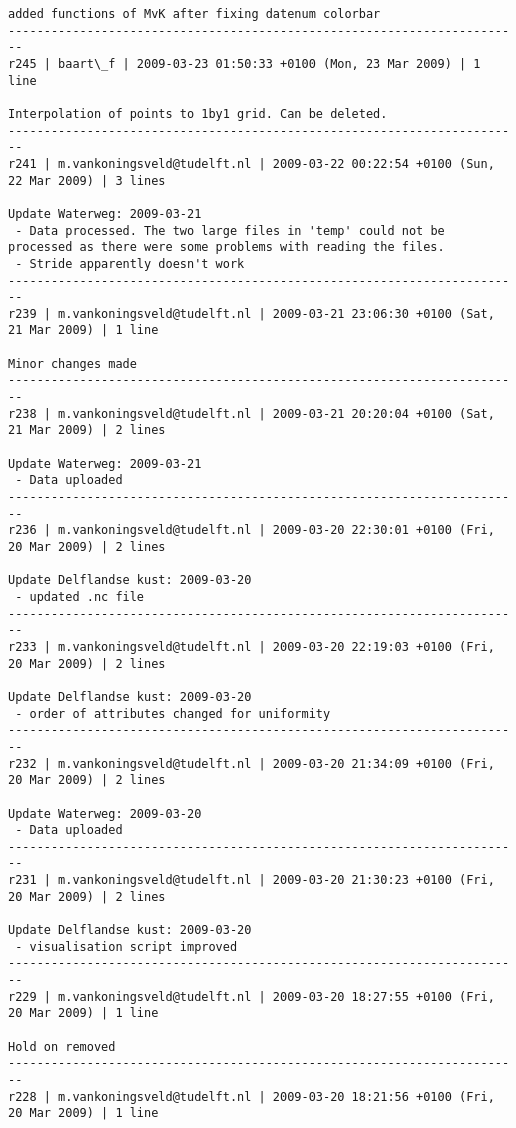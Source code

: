 \documentclass[9]{report}
\begin{document}
\begin{description}
\begin{verbatim}
added functions of MvK after fixing datenum colorbar
------------------------------------------------------------------------
r245 | baart\_f | 2009-03-23 01:50:33 +0100 (Mon, 23 Mar 2009) | 1 line

Interpolation of points to 1by1 grid. Can be deleted.
------------------------------------------------------------------------
r241 | m.vankoningsveld@tudelft.nl | 2009-03-22 00:22:54 +0100 (Sun, 22 Mar 2009) | 3 lines

Update Waterweg: 2009-03-21
 - Data processed. The two large files in 'temp' could not be processed as there were some problems with reading the files. 
 - Stride apparently doesn't work
------------------------------------------------------------------------
r239 | m.vankoningsveld@tudelft.nl | 2009-03-21 23:06:30 +0100 (Sat, 21 Mar 2009) | 1 line

Minor changes made
------------------------------------------------------------------------
r238 | m.vankoningsveld@tudelft.nl | 2009-03-21 20:20:04 +0100 (Sat, 21 Mar 2009) | 2 lines

Update Waterweg: 2009-03-21
 - Data uploaded
------------------------------------------------------------------------
r236 | m.vankoningsveld@tudelft.nl | 2009-03-20 22:30:01 +0100 (Fri, 20 Mar 2009) | 2 lines

Update Delflandse kust: 2009-03-20
 - updated .nc file
------------------------------------------------------------------------
r233 | m.vankoningsveld@tudelft.nl | 2009-03-20 22:19:03 +0100 (Fri, 20 Mar 2009) | 2 lines

Update Delflandse kust: 2009-03-20
 - order of attributes changed for uniformity
------------------------------------------------------------------------
r232 | m.vankoningsveld@tudelft.nl | 2009-03-20 21:34:09 +0100 (Fri, 20 Mar 2009) | 2 lines

Update Waterweg: 2009-03-20
 - Data uploaded
------------------------------------------------------------------------
r231 | m.vankoningsveld@tudelft.nl | 2009-03-20 21:30:23 +0100 (Fri, 20 Mar 2009) | 2 lines

Update Delflandse kust: 2009-03-20
 - visualisation script improved
------------------------------------------------------------------------
r229 | m.vankoningsveld@tudelft.nl | 2009-03-20 18:27:55 +0100 (Fri, 20 Mar 2009) | 1 line

Hold on removed
------------------------------------------------------------------------
r228 | m.vankoningsveld@tudelft.nl | 2009-03-20 18:21:56 +0100 (Fri, 20 Mar 2009) | 1 line


\end{verbatim}
\end{description}
\end{document}
